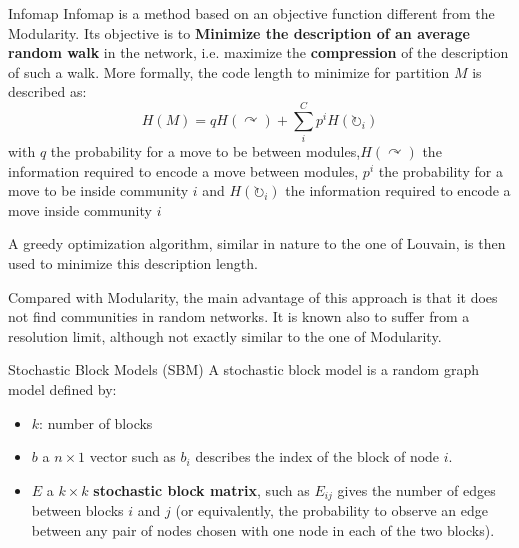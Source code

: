 \begin{textbox}{Infomap}
Infomap\cite{rosvall2008maps} is a method based on an objective function different from the Modularity. Its objective is to \textbf{Minimize the description of an average random walk} in the network, i.e. maximize the \textbf{compression} of the description of such a walk. More formally, the code length to minimize for partition $M$ is described as:
\[
H(M)=qH(\curvearrowright)+\sum_i^Cp^iH(\circlearrowright_i)
\]
with $q$ the probability for a move to be between modules,$H(\curvearrowright)$ the information required to encode a move between modules, $p^i$ the probability for a move to be inside community $i$ and $H(\circlearrowright_i)$ the information required to encode a move inside community $i$

A greedy optimization algorithm, similar in nature to the one of Louvain, is then used to minimize this description length.

Compared with Modularity, the main advantage of this approach is that it does not find communities in random networks. It is known also to suffer from a resolution limit, although not exactly similar to the one of Modularity.
\end{textbox}

\begin{textbox}{Stochastic Block Models (SBM)}
A stochastic block model is a random graph model defined by:
\begin{itemize}
\item $k$: number of blocks 
    \item $b$ a $n\times 1$ vector such as $b_i$ describes the index of the block of node $i$.
    \item $E$ a $k\times k$ \textbf{stochastic block matrix}, such as $E_{ij}$ gives the number of edges between blocks $i$ and $j$ (or equivalently, the probability to observe an edge between any pair of nodes chosen with one node in each of the two blocks).
\end{itemize}
\end{textbox}

